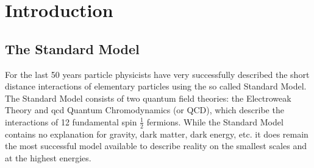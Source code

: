 \chapter{Introduction}

\section{The Standard Model}
\label{SM}
For the last 50 years particle physicists have very successfully described the short distance interactions of elementary particles using the so called Standard Model.  
The Standard Model consists of two quantum field theories: the Electroweak Theory and \gls{qcd} Quantum Chromodynamics (or QCD), which describe the interactions of 12 fundamental spin $\frac{1}{2}$ fermions.  
While the Standard Model contains no explanation for gravity, dark matter, dark energy, etc. it does remain the most successful model available to describe reality on the smallest scales and at the highest energies. \\ 

